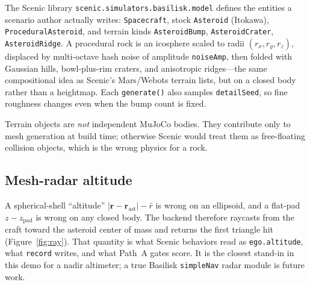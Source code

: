 \documentclass[10pt]{article}
\begin{document}
The Scenic library \texttt{scenic.simulators.basilisk.model} defines the entities a scenario author actually writes:
\texttt{Spacecraft}, stock \texttt{Asteroid} (Itokawa), \texttt{ProceduralAsteroid}, and terrain kinds \texttt{AsteroidBump}, \texttt{AsteroidCrater}, \texttt{AsteroidRidge}.
A procedural rock is an icosphere scaled to radii $(r_x, r_y, r_z)$, displaced by multi-octave hash noise of amplitude \texttt{noiseAmp}, then folded with Gaussian hills, bowl-plus-rim craters, and anisotropic ridges---the same compositional idea as Scenic's Mars/Webots terrain lists, but on a closed body rather than a heightmap.
Each \texttt{generate()} also samples \texttt{detailSeed}, so fine roughness changes even when the bump count is fixed.

Terrain objects are \emph{not} independent MuJoCo bodies.
They contribute only to mesh generation at build time; otherwise Scenic would treat them as free-floating collision objects, which is the wrong physics for a rock.

\subsection{Mesh-radar altitude}

A spherical-shell ``altitude'' $|\mathbf{r}-\mathbf{r}_{\mathrm{ast}}|-\bar{r}$ is wrong on an ellipsoid, and a flat-pad $z-z_{\mathrm{pad}}$ is wrong on any closed body.
The backend therefore raycasts from the craft toward the asteroid center of mass and returns the first triangle hit (Figure~\ref{fig:ray}).
That quantity is what Scenic behaviors read as \texttt{ego.altitude}, what \texttt{record} writes, and what Path~A gates score.
It is the closest stand-in in this demo for a nadir altimeter; a true Basilisk \texttt{simpleNav} radar module is future work.
\end{document}
